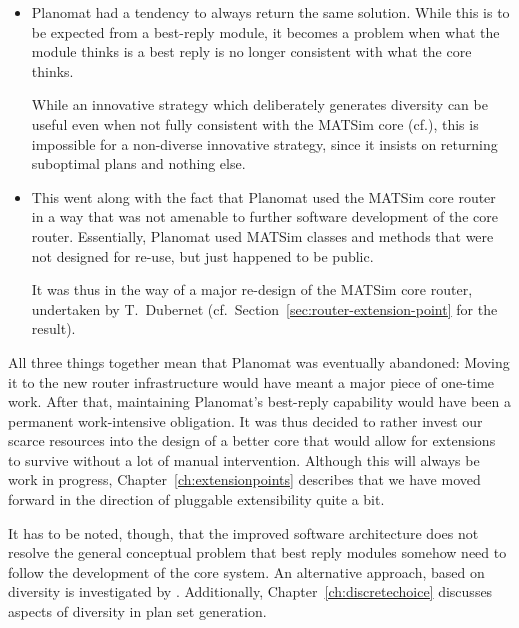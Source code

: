\begin{itemize}

\item Planomat had a tendency to always return the same solution.  While this is to be expected from a best-reply module, it becomes a problem when what the module thinks is a best reply is no longer consistent with what the core thinks.  

While an innovative strategy which deliberately generates  diversity can be useful even when not fully consistent with the MATSim core (cf.\cite{NagelKickhoeferJoubertHeterogeneousVoTs}), this is impossible for a non-diverse innovative strategy, since it insists on returning suboptimal plans and nothing else.

\item This went along with the fact that Planomat used the MATSim core router in a way that was not amenable to further software development of the core router.  Essentially, Planomat used MATSim classes and methods that were not designed for re-use, but just happened to be public.

It was thus in the way of a major re-design of the MATSim core router, undertaken by T.~Dubernet (cf.~Section~\ref{sec:router-extension-point} for the result).

\end{itemize}

All three things together mean that Planomat was eventually abandoned: Moving it to the new router infrastructure would have meant a major piece of one-time work.  After that, maintaining Planomat's best-reply capability would have been a permanent work-intensive obligation.  It was thus decided to rather invest our scarce resources into the design of a better core that would allow for extensions to survive without a lot of manual intervention.  Although this will always be work in progress, Chapter~\ref{ch:extensionpoints} describes that we have moved forward in the direction of pluggable extensibility quite a bit.

It has to be noted, though, that the improved software architecture does not resolve the general conceptual problem that best reply modules somehow need to follow the development of the core system.  An alternative approach, based on diversity is investigated by \cite{NagelKickhoeferJoubertHeterogeneousVoTs}.  Additionally, Chapter~\ref{ch:discretechoice} discusses aspects of diversity in plan set generation.

